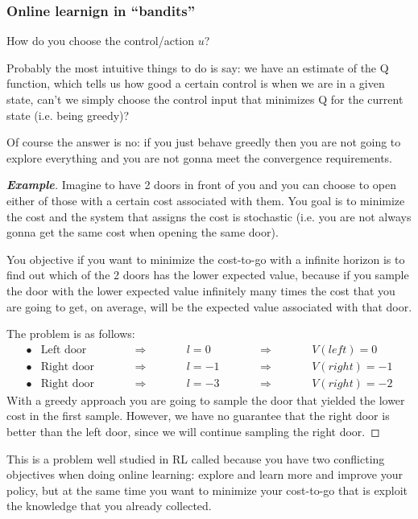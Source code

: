 \subsubsection{Online learnign in ``bandits''}
How do you choose the control/action $u$?

Probably the most intuitive things to do is say: we have an estimate of the Q function, which tells us how good a certain control is when we are in a given state, can't we simply choose the control input that minimizes Q for the current state (i.e. being greedy)?

Of course the answer is no: if you just behave greedly then you are not going to explore everything and you are not gonna meet the convergence requirements.

\begin{proof}[\textbf{Example}]
Imagine to have 2 doors in front of you and you can choose to open either of those with a certain cost associated with them. You goal is to minimize the cost and the system that assigns the cost is stochastic (i.e. you are not always gonna get the same cost when opening the same door).

You objective if you want to minimize the cost-to-go with a infinite horizon is to find out which of the 2 doors has the lower expected value, because if you sample the door with the lower expected value infinitely many times the cost that you are going to get, on average, will be the expected value associated with that door.

The problem is as follows:
\begin{align*}
\bullet& \text{Left door} &\qquad& \Rightarrow&\qquad& l = 0 & \qquad& \Rightarrow&\qquad& V(left) = 0\\
\bullet &\text{Right door} & \qquad& \Rightarrow&\qquad& l = -1 & \qquad& \Rightarrow&\qquad & V(right) = -1\\
\bullet &\text{Right door} & \qquad& \Rightarrow&\qquad& l = -3 & \qquad& \Rightarrow&\qquad& V(right) = -2
\end{align*}
With a greedy approach you are going to sample the door that yielded the lower cost in the first sample. However, we have no guarantee that the right door is better than the left door, since we will continue sampling the right door.
\end{proof}

This is a problem well studied in RL called  because you have two conflicting objectives when doing online learning: explore and learn more and improve your policy, but at the same time you want to minimize your cost-to-go that is exploit the knowledge that you already collected.

